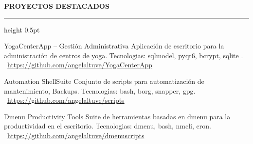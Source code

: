 \documentclass[11pt, a4paper]{article}
\newcommand{\cvsection}[1]{
    \vspace{0.3cm}
    {\large\textbf{\color{accentyellow}#1}}
    \vspace{0.2cm}
    \hrule height 0.5pt
    \vspace{0.3cm}
}
\begin{document}
\cvsection{\faFolder \hspace{0.5em} PROYECTOS DESTACADOS}

\begin{projectcard}{YogaCenterApp -- Gestión Administrativa}
Aplicación de escritorio para la administración de centros de yoga. Tecnologias: sqlmodel, pyqt6, bcrypt, sqlite .
\\ \footnotesize \faLink\ \url{https://github.com/angelaltuve/YogaCenterApp}
\end{projectcard}

\vspace{0.2cm}

\begin{projectcard}{Automation ShellSuite}
Conjunto de scripts para automatización de mantenimiento, Backups. Tecnologias: bash, borg, snapper, gpg.
\\ \footnotesize \faLink\ \url{https://github.com/angelaltuve/scripts}
\end{projectcard}

\vspace{0.2cm}

\begin{projectcard}{Dmenu Productivity Tools}
Suite de herramientas basadas en dmenu para la productividad en el escritorio. Tecnologias: dmenu, bash, nmcli, cron.
\\ \footnotesize \faLink\ \url{https://github.com/angelaltuve/dmenuscripts}
\end{projectcard}
\end{document}

